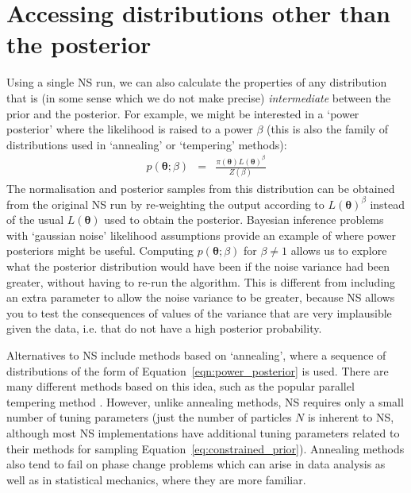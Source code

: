 \documentclass[entropy,article,submit,moreauthors,pdftex,10pt,a4paper]{Definitions/mdpi}
\newcommand{\xx}{\boldsymbol{\theta}}
\begin{document}
\section{Accessing distributions other than the posterior}
Using a single NS run, we can also calculate the properties of any
distribution that
is (in some sense which we do not make precise) {\em intermediate}
between the prior and the posterior. For example, we might be interested in
a `power posterior' where the likelihood is raised to a power $\beta$
(this is also the family of distributions used in `annealing' or `tempering'
methods):
\begin{eqnarray}
p(\xx; \beta) &=& \frac{\pi(\xx)L(\xx)^\beta}
                       {Z(\beta)}\label{eqn:power_posterior}
\end{eqnarray}
The normalisation and posterior samples from this distribution can be obtained
from the original NS run by re-weighting the output according to $L(\xx)^\beta$
instead of the usual $L(\xx)$ used to obtain the posterior.
Bayesian inference problems with `gaussian noise' likelihood assumptions
provide an example of where power posteriors might be useful.
Computing $p(\xx; \beta)$ for $\beta \neq 1$ allows us to explore what the
posterior distribution would have been if the noise variance had been greater,
without having to re-run the algorithm.
This is different from including an extra parameter to allow the noise variance
to be greater, because NS allows you to test the consequences of values of the
variance that are very implausible given the data, i.e. that do not have
a high posterior probability.

Alternatives to NS include methods based on `annealing', where a sequence of
distributions of the form of Equation~\ref{eqn:power_posterior} is used.
There are many different methods based on this idea, such as the popular
parallel tempering method \citep{pt, gregory}.
However, unlike annealing methods, NS requires only a small number of
tuning parameters (just the number of particles $N$ is inherent to NS, although
most NS implementations have additional tuning parameters related to their
methods for sampling Equation~\ref{eq:constrained_prior}). Annealing methods
also tend to fail on phase change problems \citep{skilling} which can arise
in data analysis \citep{rjobject, exoplanet} as well as in statistical
mechanics, where they are more familiar.
\end{document}
